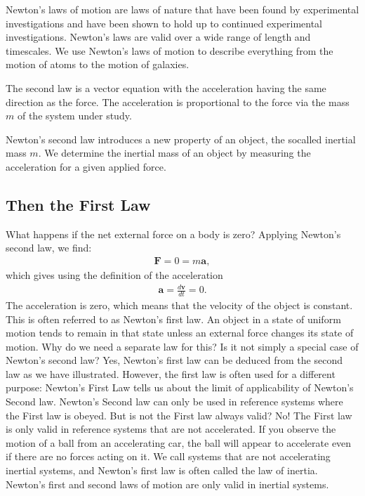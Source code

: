 \documentclass[letterpaper,10pt,english]{sphinxmanual}
\begin{document}
Newton’s laws of motion are laws of nature that have been found by experimental
investigations and have been shown to hold up to continued experimental investigations.
Newton’s laws are valid over a wide range of length\sphinxhyphen{} and time\sphinxhyphen{}scales. We
use Newton’s laws of motion to describe everything from the motion of atoms to the
motion of galaxies.

The second law is a vector equation with the acceleration having the same
direction as the force. The acceleration is proportional to the force via the mass \(m\) of the system under study.

Newton’s second law introduces a new property of an object, the so\sphinxhyphen{}called
inertial mass \(m\). We determine the inertial mass of an object by measuring the
acceleration for a given applied force.


\subsection{Then the First Law}
\label{\detokenize{chapter2:then-the-first-law}}
What happens if the net external force on a body is zero? Applying Newton’s second
law, we find:
\begin{equation*}
\begin{split}
\boldsymbol{F} = 0 = m\boldsymbol{a},
\end{split}
\end{equation*}
which gives using the definition of the acceleration
\begin{equation*}
\begin{split}
\boldsymbol{a} = \frac{d\boldsymbol{v}}{dt}=0.
\end{split}
\end{equation*}
The acceleration is zero, which means that the velocity of the object is constant. This
is often referred to as Newton’s first law. An object in a state of uniform motion tends to remain in
that state unless an external force changes its state of motion.
Why do we need a separate law for this? Is it not simply a special case of Newton’s
second law? Yes, Newton’s first law can be deduced from the second law as we have
illustrated. However, the first law is often used for a different purpose: Newton’s
First Law tells us about the limit of applicability of Newton’s Second law. Newton’s
Second law can only be used in reference systems where the First law is obeyed. But
is not the First law always valid? No! The First law is only valid in reference systems
that are not accelerated. If you observe the motion of a ball from an accelerating
car, the ball will appear to accelerate even if there are no forces acting on it. We call
systems that are not accelerating inertial systems, and Newton’s first law is often
called the law of inertia. Newton’s first and second laws of motion are only valid in
inertial systems.
\end{document}
